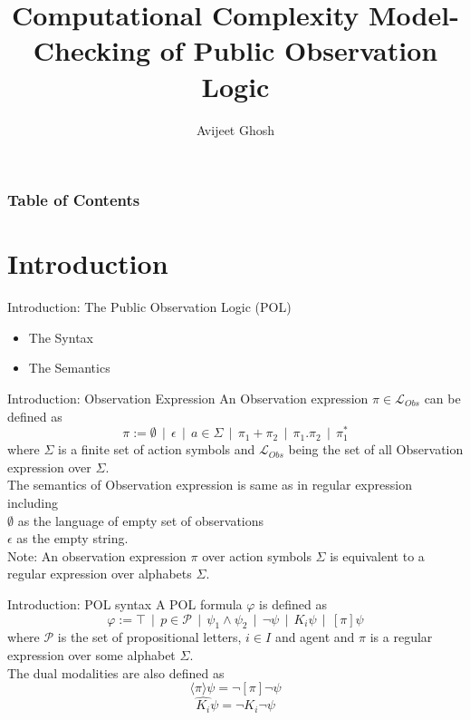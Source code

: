 \documentclass{beamer}
\title[Model-Checking of Public Observation Logic]{Computational Complexity Model-Checking of Public Observation Logic}
\author[Avijeet Ghosh]{Avijeet Ghosh}
\institute[ISI, Kolkata]{Indian Statistical Institute, Kolkata}
\newcommand\ldiaarg[1]{\langle#1\rangle}
\newcommand{\LL}{\mathcal{L}} %
\begin{document}
\begin{frame}
 \maketitle
\end{frame}

\begin{frame}
\frametitle{Table of Contents}
 \tableofcontents
\end{frame}

\section{Introduction}

\begin{frame}{Introduction: The Public Observation Logic (POL)}
    \begin{itemize}
        \item<1-> The Syntax
        \item<2-> The Semantics
    \end{itemize}
\end{frame}

\begin{frame}{Introduction: Observation Expression}
    An Observation expression $\pi\in\LL_{Obs}$ can be defined as
    $$
    \pi := \emptyset\ \ |\ \ \epsilon\ \ |\ \ a\in\Sigma\ \ |\ \ \pi_1 +\pi_2\ \ |\ \ \pi_1.\pi_2\ \ |\ \ \pi_1^{*}
    $$
    where $\Sigma$ is a finite set of action symbols and $\LL_{Obs}$ being the set of all Observation expression over $\Sigma$.\\\pause
    The semantics of Observation expression is same as in regular expression including\\\pause
    $\emptyset$ as the language of empty set of observations\\\pause
    $\epsilon$ as the empty string.\\\pause
    Note: An observation expression $\pi$ over action symbols $\Sigma$ is equivalent to a regular expression over alphabets $\Sigma$.
\end{frame}

\begin{frame}{Introduction: POL syntax}
    A POL formula $\varphi$ is defined as
    $$
    \varphi := \top\ \ |\ \ p\in\mathcal{P}\ \ |\ \ \psi_1\wedge\psi_2\ \ |\ \ \neg{\psi}\ \ |\ \ K_i\psi\ \ |\ \ [\pi]\psi
    $$
    where $\mathcal{P}$ is the set of propositional letters, $i\in I$ and agent and $\pi$ is a regular expression over some alphabet $\Sigma$.\\\pause
    The dual modalities are also defined as 
    $$\ldiaarg{\pi}\psi = \neg{[\pi]\neg{\psi}}$$
    $$\hat{K_i}\psi = \neg{K_i\neg{\psi}}$$
    
\end{frame}
\end{document}
